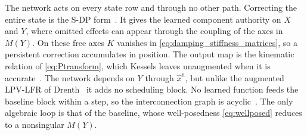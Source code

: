 The network acts on every state row and through no other path.
Correcting the entire state is the S-DP form~\cite[Sec.~2]{hoekstra2025lfr}.
It gives the learned component authority on $X$ and $Y$, where omitted
effects can appear through the coupling of the axes in $M(Y)$.
On these free axes $K$ vanishes in \eqref{eq:damping_stiffness_matrices}, so
a persistent correction accumulates in position.
The output map is the kinematic relation of \eqref{eq:Ptransform}, which
Kessels leaves unaugmented when it is accurate~\cite[Remark~5.3]{kessels2025ai}.
The network depends on $Y$ through $\hat x^{\mathrm n}$, but unlike the
augmented LPV-LFR of Drenth~\cite[Eq.~(5.2)]{drenth2025thesis} it adds no
scheduling block.
No learned function feeds the baseline block within a step, so the
interconnection graph is acyclic~\cite[Thm.~1]{hoekstra2025lfr}.
The only algebraic loop is that of the baseline, whose well-posedness
\eqref{eq:wellposed} reduces to a nonsingular $M(Y)$.

